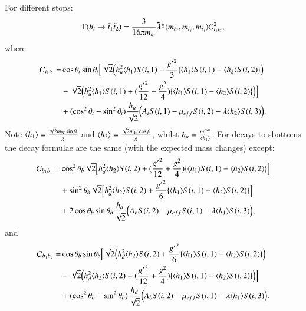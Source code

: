 \documentclass[final,3p,times]{elsarticle}
\begin{document}
For different stops:
\begin{equation} \label{hst1st2NMSSM}
\Gamma( h_{i} \rightarrow \tilde{t}_{1} \tilde{t}_{2} ) = {3 \over 16\pi m_{h_i}} \tilde{\lambda}^{1 \over 2}(m_{{h}_i},m_{\tilde{t}_j},m_{\tilde{t}_j})\mathcal{C}_{t_{1}t_{2}}^2,
\end{equation}
where
\begin{equation}
\begin{aligned}
\mathcal{C}_{t_{1}t_{2}} = & \cos\theta_t \sin\theta_t \Big[\sqrt{2} \Big(h_{u}^2 \langle h_{1} \rangle S(i,1) - {{g'}^2 \over 3}\{\langle h_{1} \rangle S(i,1) - \langle h_{2} \rangle S(i,2)\}\Big) \\ & - \sqrt{2}\Big(h_{u}^2 \langle h_{1} \rangle S(i,1)  + ({{g'}^2 \over 12} - {g^2 \over 4})\{\langle h_{1} \rangle S(i,1) - \langle h_{2} \rangle S(i,2)\}\Big)\Big] \\ & + (\cos^2 \theta_t - \sin^2 \theta_t) {h_{u} \over \sqrt{2}} \Big(A_{t} S(i,1) - \mu_{eff} S(i,2) - \lambda \langle h_{2} \rangle S(i,3)\Big).
\end{aligned}
\end{equation}
Note $\langle h_{1} \rangle = {\sqrt{2} m_{W} \sin\beta \over g}$ and $\langle h_{2} \rangle = {\sqrt{2} m_{W} \cos\beta \over g}$, whilst $h_{u} = {m_{t}^{run} \over \langle h_{1} \rangle}$. \label{vevsh}
For decays to sbottoms the decay formulae are the same (with the expected mass changes) except:
\begin{equation}
\begin{aligned}
\mathcal{C}_{b_{1}b_{1}} = & \cos^2\theta_b \sqrt{2}\Big[h_{d}^2 \langle h_{2} \rangle S(i,2) + ({{g'}^{2} \over 12} + {g^2 \over 4})\{\langle h_{1} \rangle S(i,1) - \langle h_{2} \rangle S(i,2)\}\Big] \\ & + \sin^2 \theta_b \sqrt{2} \Big[h_{d}^2 \langle h_{2} \rangle S(i,2) + {{g'}^2 \over 6}\{\langle h_{1} \rangle S(i,1) - \langle h_{2} \rangle S(i,2)\}\Big] \\ & + 2\cos\theta_b \sin\theta_b {h_{d} \over \sqrt{2}}\Big(A_b S(i,2) - \mu_{eff} S(i,1) - \lambda \langle h_{1} \rangle S(i,3)\Big),
\end{aligned}
\end{equation}
and
\begin{equation}
\begin{aligned}
\mathcal{C}_{b_{1}b_{2}} = & \cos\theta_b \sin\theta_b \Big[\sqrt{2} \Big(h_{d}^2 \langle h_{2} \rangle S(i,2) + {{g'}^2 \over 6}\{\langle h_{1} \rangle S(i,1) - \langle h_{2} \rangle S(i,2)\}\Big) \\ & - \sqrt{2}\Big(h_{d}^2 \langle h_{2} \rangle S(i,2)  + ({{g'}^2 \over 12} + {g^2 \over 4})\{\langle h_{1} \rangle S(i,1) - \langle h_{2} \rangle S(i,2)\}\Big)\Big] \\ & + (\cos^2 \theta_b - \sin^2 \theta_b) {h_{d} \over \sqrt{2}} \Big(A_{b} S(i,2) - \mu_{eff} S(i,1) - \lambda \langle h_{1} \rangle S(i,3)\Big).
\end{aligned}
\end{equation}
\end{document}

